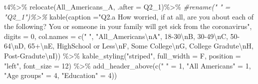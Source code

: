 \documentclass[
]{article}
\newenvironment{Shaded}{\begin{snugshade}}{\end{snugshade}}
\newcommand{\AttributeTok}[1]{\textcolor[rgb]{0.77,0.63,0.00}{#1}}
\newcommand{\CommentTok}[1]{\textcolor[rgb]{0.56,0.35,0.01}{\textit{#1}}}
\newcommand{\DecValTok}[1]{\textcolor[rgb]{0.00,0.00,0.81}{#1}}
\newcommand{\FunctionTok}[1]{\textcolor[rgb]{0.00,0.00,0.00}{#1}}
\newcommand{\NormalTok}[1]{#1}
\newcommand{\OtherTok}[1]{\textcolor[rgb]{0.56,0.35,0.01}{#1}}
\newcommand{\SpecialCharTok}[1]{\textcolor[rgb]{0.00,0.00,0.00}{#1}}
\newcommand{\StringTok}[1]{\textcolor[rgb]{0.31,0.60,0.02}{#1}}
\begin{document}
\begin{Shaded}
\begin{Highlighting}[]
\NormalTok{t4}\SpecialCharTok{\%\textgreater{}\%}
  \FunctionTok{relocate}\NormalTok{(All\_Americans\_A, }\AttributeTok{.after =}\NormalTok{ Q2\_1)}\SpecialCharTok{\%\textgreater{}\%}
  \CommentTok{\#rename(" " = "Q2\_1")\%\textgreater{}\%}
  \FunctionTok{kable}\NormalTok{(}\AttributeTok{caption =}\StringTok{"Q2.a How worried, if at all, are you about each of the following? You or someone in your family will get sick from the coronavirus"}\NormalTok{, }\AttributeTok{digits =} \DecValTok{0}\NormalTok{, }
        \AttributeTok{col.names =} \FunctionTok{c}\NormalTok{(}\StringTok{" "}\NormalTok{, }\StringTok{"All\_Americans}\SpecialCharTok{\textbackslash{}n}\StringTok{A"}\NormalTok{, }\StringTok{\textquotesingle{}18{-}30}\SpecialCharTok{\textbackslash{}n}\StringTok{B\textquotesingle{}}\NormalTok{, }\StringTok{\textquotesingle{}30{-}49}\SpecialCharTok{\textbackslash{}n}\StringTok{C\textquotesingle{}}\NormalTok{, }\StringTok{\textquotesingle{}50{-}64}\SpecialCharTok{\textbackslash{}n}\StringTok{D\textquotesingle{}}\NormalTok{, }\StringTok{\textquotesingle{}65+}\SpecialCharTok{\textbackslash{}n}\StringTok{E\textquotesingle{}}\NormalTok{,}
                      \StringTok{\textquotesingle{}HighSchool or Less}\SpecialCharTok{\textbackslash{}n}\StringTok{F\textquotesingle{}}\NormalTok{, }\StringTok{\textquotesingle{}Some College}\SpecialCharTok{\textbackslash{}n}\StringTok{G\textquotesingle{}}\NormalTok{, }\StringTok{\textquotesingle{}College  Gradute}\SpecialCharTok{\textbackslash{}n}\StringTok{H\textquotesingle{}}\NormalTok{,}
                      \StringTok{\textquotesingle{}Post{-}Gradute}\SpecialCharTok{\textbackslash{}n}\StringTok{I\textquotesingle{}}\NormalTok{)) }\SpecialCharTok{\%\textgreater{}\%}
  \FunctionTok{kable\_styling}\NormalTok{(}\StringTok{"striped"}\NormalTok{, }\AttributeTok{full\_width =}\NormalTok{ F,}
                \AttributeTok{position =} \StringTok{"left"}\NormalTok{, }\AttributeTok{font\_size =} \DecValTok{12}\NormalTok{) }\SpecialCharTok{\%\textgreater{}\%}
  \FunctionTok{add\_header\_above}\NormalTok{(}\FunctionTok{c}\NormalTok{(}\StringTok{" "} \OtherTok{=} \DecValTok{1}\NormalTok{, }\StringTok{"All Americans"} \OtherTok{=} \DecValTok{1}\NormalTok{, }\StringTok{"Age groups"} \OtherTok{=} \DecValTok{4}\NormalTok{, }\StringTok{"Education"} \OtherTok{=} \DecValTok{4}\NormalTok{))}
\end{Highlighting}
\end{Shaded}
\end{document}
